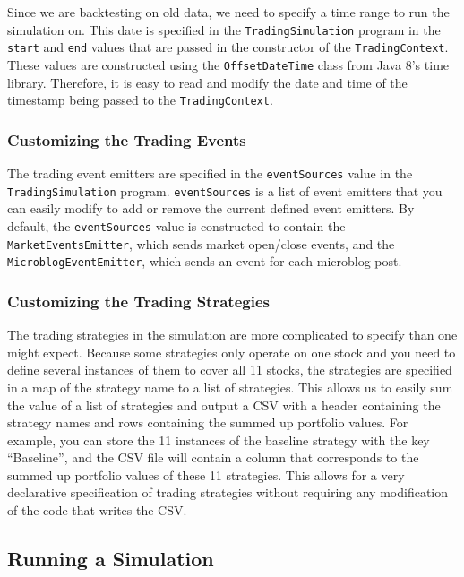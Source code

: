 Since we are backtesting on old data, we need to specify a time range to run the simulation on. This date is specified in the \texttt{TradingSimulation} program in the \texttt{start} and \texttt{end} values that are passed in the constructor of the \texttt{TradingContext}. These values are constructed using the \texttt{OffsetDateTime} class from Java 8's time library. Therefore, it is easy to read and modify the date and time of the timestamp being passed to the \texttt{TradingContext}.

\subsubsection{Customizing the Trading Events}

The trading event emitters are specified in the \texttt{eventSources} value in the \texttt{TradingSimulation} program. \texttt{eventSources} is a list of event emitters that you can easily modify to add or remove the current defined event emitters. By default, the \texttt{eventSources} value is constructed to contain the \texttt{MarketEventsEmitter}, which sends market open/close events, and the \texttt{MicroblogEventEmitter}, which sends an event for each microblog post.

\subsubsection{Customizing the Trading Strategies}

The trading strategies in the simulation are more complicated to specify than one might expect. Because some strategies only operate on one stock and you need to define several instances of them to cover all 11 stocks, the strategies are specified in a map of the strategy name to a list of strategies. This allows us to easily sum the value of a list of strategies and output a CSV with a header containing the strategy names and rows containing the summed up portfolio values. For example, you can store the 11 instances of the baseline strategy with the key ``Baseline'', and the CSV file will contain a column that corresponds to the summed up portfolio values of these 11 strategies. This allows for a very declarative specification of trading strategies without requiring any modification of the code that writes the CSV.

\subsection{Running a Simulation}

